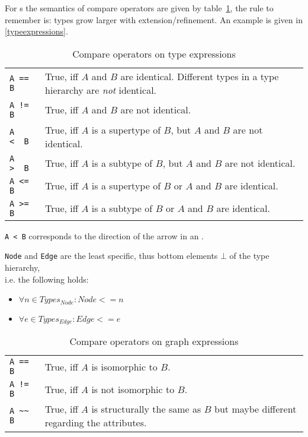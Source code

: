 For s the semantics of compare operators are given by table~\ref{compandtypes},
the rule to remember is: types grow larger with extension/refinement. An example is given in \ref{typeexpressions}.
\begin{table}[htbp]
  \centering
  \begin{tabularx}{\linewidth}{|l|X|} \hline
    \texttt{A == B} & True, iff $A$ and $B$ are identical. Different types in a type hierarchy are \emph{not} identical. \\
    \texttt{A != B} & True, iff $A$ and $B$ are not identical. \\
    \texttt{A <\ \ B} & True, iff $A$ is a supertype of $B$, but $A$ and $B$ are not identical. \\
    \texttt{A >\ \ B} & True, iff $A$ is a subtype of $B$, but $A$ and $B$ are not identical. \\
    \texttt{A <= B} & True, iff $A$ is a supertype of $B$ or $A$ and $B$ are identical. \\
    \texttt{A >= B} & True, iff $A$ is a subtype of $B$ or $A$ and $B$ are identical. \\ \hline
  \end{tabularx}
  \caption{Compare operators on type expressions}
  \label{compandtypes}
\end{table}
\begin{note}
  \texttt{A < B} corresponds to the direction of the arrow in an .
\end{note}
\begin{note}
  \texttt{Node} and \texttt{Edge} are the least specific, thus bottom elements $\bot$ of the type hierarchy,\\
  i.e. the following holds:
  \begin{itemize}
    \item $\forall n\in Types_{Node}: Node <= n$
    \item $\forall e\in Types_{Edge}: Edge <= e$
  \end{itemize}
\end{note}

\begin{table}[htbp]
  \centering
  \begin{tabularx}{\linewidth}{|l|X|} \hline
    \texttt{A == B} & True, iff $A$ is isomorphic to $B$. \\
    \texttt{A != B} & True, iff $A$ is not isomorphic to $B$. \\
    \texttt{A \textasciitilde\textasciitilde{ } B} & True, iff $A$ is structurally the same as $B$ but maybe different regarding the attributes. \\ \hline
  \end{tabularx}
  \caption{Compare operators on graph expressions}
  \label{compandgraph}
\end{table}

